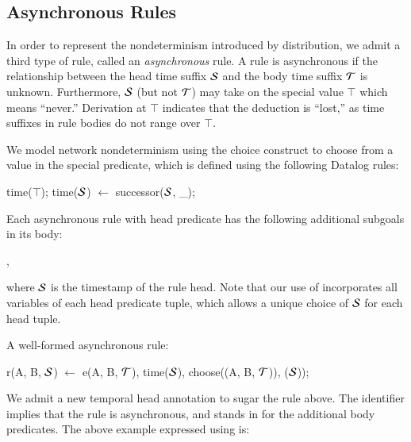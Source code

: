 \subsection{Asynchronous Rules}

In order to represent the nondeterminism introduced by distribution, we admit a
third type of rule, called an {\em asynchronous} rule.  A rule is asynchronous
if the 
relationship between the head time suffix $\SDedalus$ and the body time suffix $\Tau$ is
unknown.  Furthermore, $\SDedalus$ (but not $\Tau$) may take on the special value
$\top$ which means ``never.''  Derivation at $\top$ indicates that the
deduction is ``lost,'' as time suffixes in rule bodies do not range over
$\top$.

We model network nondeterminism using the choice construct to choose
from a value in the special 
predicate, which is defined using the following Datalog rules:

\begin{Dedalus}
time(\(\top\));
time(\(\SDedalus\)) \(\leftarrow\) successor(\(\SDedalus\), _);
\end{Dedalus}

\noindent
Each asynchronous rule with head predicate  has the following additional subgoals in its
body:

, 

\noindent
where
$\SDedalus$ is the timestamp of the rule head.  Note that our use of  incorporates all variables of each head predicate tuple, which allows a unique choice of $\SDedalus$ for each head tuple.


\begin{example}
A well-formed asynchronous \lang rule:

\begin{Dedalus}
r(A, B, \(\SDedalus\)) \(\leftarrow\) 
  e(A, B, \(\Tau\)),
  time(\(\SDedalus\)), choose((A, B, \(\Tau\))), (\(\SDedalus\)));
\end{Dedalus}
\end{example}

We admit a new temporal head annotation to sugar the rule above.  The
identifier  implies that the rule is asynchronous, and stands in for
the additional body predicates.
The above example expressed using  is:

